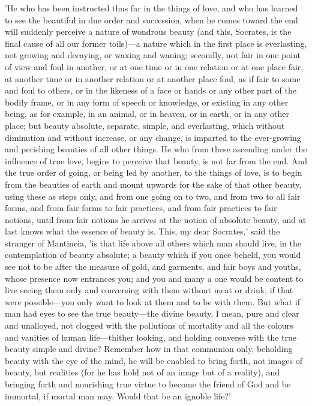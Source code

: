 \para[122] 'He who has been instructed thus far in the things of love, and who has learned to see the beautiful in due order and succession, when he comes toward the end will suddenly perceive a nature of wondrous beauty (and this, Socrates, is the final cause of all our former toils)---a nature which in the first place is everlasting, not growing and decaying, or waxing and waning; secondly, not fair in one point of view and foul in another, or at one time or in one relation or at one place fair, at another time or in another relation or at another place foul, as if fair to some and foul to others, or in the likeness of a face or hands or any other part of the bodily frame, or in any form of speech or knowledge, or existing in any other being, as for example, in an animal, or in heaven, or in earth, or in any other place; but beauty absolute, separate, simple, and everlasting, which without diminution and without increase, or any change, is imparted to the ever-growing and perishing beauties of all other things. He who from these ascending under the influence of true love, begins to perceive that beauty, is not far from the end. And the true order of going, or being led by another, to the things of love, is to begin from the beauties of earth and mount upwards for the sake of that other beauty, using these as steps only, and from one going on to two, and from two to all fair forms, and from fair forms to fair practices, and from fair practices to fair notions, until from fair notions he arrives at the notion of absolute beauty, and at last knows what the essence of beauty is. This, my dear Socrates,' said the stranger of Mantineia, 'is that life above all others which man should live, in the contemplation of beauty absolute; a beauty which if you once beheld, you would see not to be after the measure of gold, and garments, and fair boys and youths, whose presence now entrances you; and you and many a one would be content to live seeing them only and conversing with them without meat or drink, if that were possible---you only want to look at them and to be with them. But what if man had eyes to see the true beauty---the divine beauty, I mean, pure and clear and unalloyed, not clogged with the pollutions of mortality and all the colours and vanities of human life---thither looking, and holding converse with the true beauty simple and divine? Remember how in that communion only, beholding beauty with the eye of the mind, he will be enabled to bring forth, not images of beauty, but realities (for he has hold not of an image but of a reality), and bringing forth and nourishing true virtue to become the friend of God and be immortal, if mortal man may. Would that be an ignoble life?'

